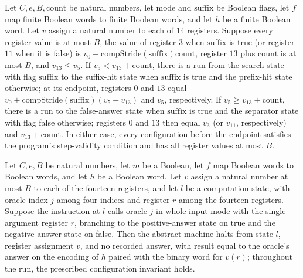 \begin{lemma}
\label{Complexity.comp_seek_run}
\leanok
{}
Let $C,e,B,\text{count}$ be natural numbers, let $\text{mode}$ and $\text{suffix}$ be
Boolean flags, let $f$ map finite Boolean words to finite Boolean words, and let $h$ be
a finite Boolean word. Let $v$ assign a natural number to each of $14$ registers.
Suppose every register value is at most $B$, the value of register $3$ when
$\text{suffix}$ is true (or register $11$ when it is false) is
$v_0+\text{compStride}(\text{suffix})\text{count}$, register $13$ plus $\text{count}$ is at
most $B$, and $v_{13}\le v_5$. If $v_5<v_{13}+\text{count}$, there is a run from the
search state with flag $\text{suffix}$ to the suffix-hit state when $\text{suffix}$ is
true and the prefix-hit state otherwise; at its endpoint, registers $0$ and $13$ equal
$v_0+\text{compStride}(\text{suffix})(v_5-v_{13})$ and $v_5$, respectively. If
$v_5\ge v_{13}+\text{count}$, there is a run to the false-answer state when
$\text{suffix}$ is true and the separator state with flag false otherwise; registers $0$
and $13$ then equal $v_3$ (or $v_{11}$, respectively) and $v_{13}+\text{count}$. In
either case, every configuration before the endpoint satisfies the program's
step-validity condition and has all register values at most $B$.
\end{lemma}

\begin{lemma}
\label{Complexity.comp_call_return}
\leanok
{}
Let $C,e,B$ be natural numbers, let $m$ be a Boolean, let $f$ map Boolean words to
Boolean words, and let $h$ be a Boolean word. Let $v$ assign a natural number at most
$B$ to each of the fourteen registers, and let $l$ be a computation state, with oracle
index $j$ among four indices and register $r$ among the fourteen registers. Suppose the
instruction at $l$ calls oracle $j$ in whole-input mode with the single argument
register $r$, branching to the positive-answer state on true and the negative-answer
state on false. Then the abstract machine halts from state $l$, register assignment $v$,
and no recorded answer, with result equal to the oracle's answer on the encoding of $h$
paired with the binary word for $v(r)$; throughout the run, the prescribed configuration
invariant holds.
\end{lemma}

